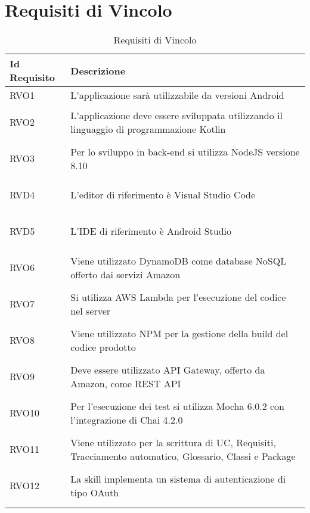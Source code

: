 \section{Requisiti di Vincolo}
\normalsize
\begin{longtable}{|>{\centering}m{5em}|m{25em}|}
	\hline
	\textbf{Id Requisito} & \textbf{Descrizione}\\
	\hline
	\endhead
	\hypertarget{RVO1}{RVO1} & L'applicazione sarà utilizzabile da versioni Android \\ \hline
	
	\hypertarget{RVO2}{RVO2} & L'applicazione deve essere sviluppata utilizzando il linguaggio di programmazione Kotlin\\ \hline
	
	\hypertarget{RVO3}{RVO3} & Per lo sviluppo in back-end si utilizza NodeJS versione 8.10\\ \hline
	
	\hypertarget{RVD4}{RVD4} & L'editor di riferimento è Visual Studio Code\\ \hline
	
	\hypertarget{RVD5}{RVD5} & L'IDE di riferimento è Android Studio \\\hline
	
	\hypertarget{RVO6}{RVO6} & Viene utilizzato DynamoDB come database NoSQL offerto dai servizi Amazon\\ \hline
	
	\hypertarget{RVO7}{RVO7} & Si utilizza AWS Lambda per l'esecuzione del codice nel server\\ \hline
	
	\hypertarget{RVO8}{RVO8} & Viene utilizzato NPM per la gestione della build del codice prodotto\\ \hline
	
	\hypertarget{RVO9}{RVO9} & Deve essere utilizzato API Gateway, offerto da Amazon, come REST API\\ \hline
	
	\hypertarget{RVO10}{RVO10} & Per l'esecuzione dei test si utilizza Mocha 6.0.2 con l'integrazione di Chai 4.2.0\\ \hline
	
	\hypertarget{RVO11}{RVO11} & Viene utilizzato \glossario{PragmaDB} per la scrittura di UC, Requisiti, Tracciamento automatico, Glossario, Classi e Package\\ \hline
	
	\hypertarget{RVO12}{RVO12} & La skill implementa un sistema di autenticazione di tipo OAuth\\ \hline
	
	\caption[Requisiti di Vincolo]{Requisiti di Vincolo}
	\label{tabella:req3}
\end{longtable}
\clearpage

